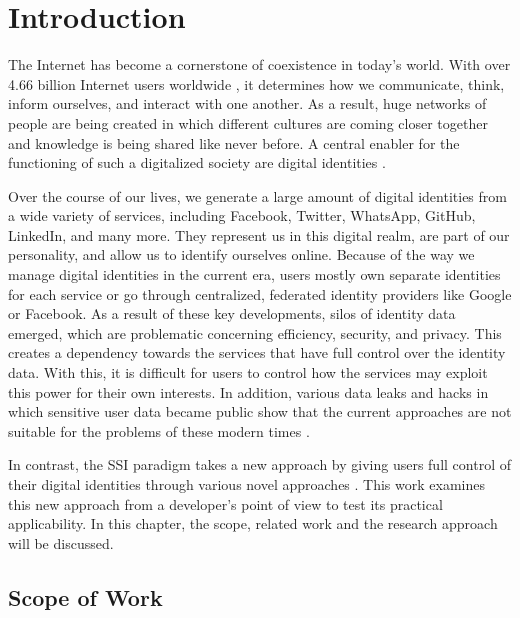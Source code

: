 \chapter{Introduction}\label{chapter: Introduction}
	The Internet has become a cornerstone of coexistence in today's world. With over 4.66 billion Internet users worldwide \cite{johnson_internet_2021}, it determines how we communicate, think, inform ourselves, and interact with one another.	As a result, huge networks of people are being created in which different cultures are coming closer together and knowledge is being shared like never before. A central enabler for the functioning of such a digitalized society are digital identities \cite{liu_blockchain-based_2020}.
	
	Over the course of our lives, we generate a large amount of digital identities from a wide variety of services, including Facebook, Twitter, WhatsApp, GitHub, LinkedIn, and many more. They represent us in this digital realm, are part of our personality, and allow us to identify ourselves online. Because of the way we manage digital identities in the current era, users mostly own separate identities for each service or go through centralized, federated identity providers like Google or Facebook. As a result of these key developments, silos of identity data emerged, which are problematic concerning efficiency, security, and privacy. This creates a dependency towards the services that have full control over the identity data. With this, it is difficult for users to control how the services may exploit this power for their own interests. In addition, various data leaks and hacks in which sensitive user data became public show that the current approaches are not suitable for the problems of these modern times \cite{swinhoe_15_2021}. \cite[pp. 2-3]{ehrlich_self-sovereign_2021}
	
	In contrast, the \ac{SSI} paradigm takes a new approach by giving users full control of their digital identities through various novel approaches \cite[p. 103059]{ferdous_search_2019}. This work examines this new approach from a developer's point of view to test its practical applicability. In this chapter, the scope, related work and the research approach will be discussed.
	
	\section{Scope of Work}\label{section: Scope of Work} %
	
